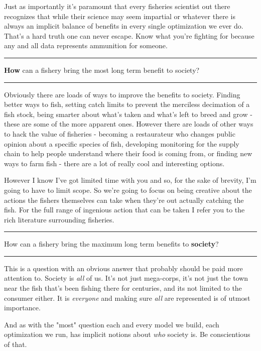 \documentclass[11pt,a5paper]{book}
\begin{document}
Just as importantly it's paramount that every fisheries scientist out there recognizes that while their science may seem impartial or whatever there is always an implicit balance of benefits in every single optimization we ever do. That's a hard truth one can never escape. Know what you're fighting for because any and all data represents ammunition for someone. 
\newpage

\noindent \rule{\textwidth}{0.5pt} 
\noindent \textbf{How} can a fishery bring the most long term benefit to society?
\newline
\rule{\textwidth}{0.5pt} 
\vspace{5pt}

Obviously there are loads of ways to improve the benefits to society. Finding better ways to fish, setting catch limits to prevent the merciless decimation of a fish stock, being smarter about what's taken and what's left to breed and grow - these are some of the more apparent ones. However there are loads of other ways to hack the value of fisheries - becoming a restaurateur who changes public opinion about a specific species of fish, developing monitoring for the supply chain to help people understand where their food is coming from, or finding new ways to farm fish - there are a lot of really cool and interesting options. 
\newline

However I know I've got limited time with you and so, for the sake of brevity, I'm going to have to limit scope. So we're going to focus on being creative about the actions the fishers themselves can take when they're out actually catching the fish. For the full range of ingenious action that can be taken I refer you to the rich literature surrounding fisheries. 
\newpage

\noindent \rule{\textwidth}{0.5pt} 
\noindent  How can a fishery bring the maximum long term benefits to \textbf{society}?
\newline
\rule{\textwidth}{0.5pt} 
\vspace{5pt}

This is a question with an obvious answer that probably should be paid more attention to. Society is \textit{all} of us. It's not just mega-corps, it's not just the town near the fish that's been fishing there for centuries, and its not limited to the consumer either. It is \textit{everyone} and making sure \textit{all} are represented is of utmost importance. 
\newline

And as with the "most" question each and every model we build, each optimization we run, has implicit notions about \textit{who} society is. Be conscientious of that. 
\newpage
\end{document}
